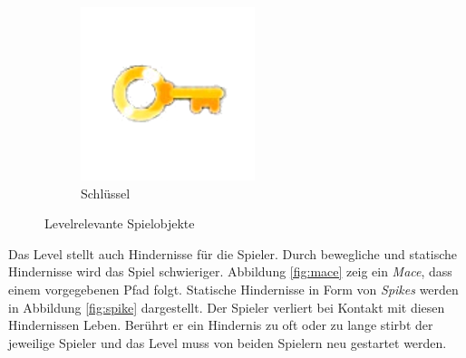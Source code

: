\begin{figure}[H]
\begin{subfigure}[H]{0.15\textwidth}
        \includegraphics[width=\textwidth]{img/realisierung/assets/key}
        \caption{Schlüssel}
        \label{fig:schluessel}
    \end{subfigure}
    \caption{Levelrelevante Spielobjekte}
    \label{fig:keyandchest}
\end{figure}

Das Level stellt auch Hindernisse für die Spieler. Durch bewegliche und statische Hindernisse wird das Spiel schwieriger. Abbildung \ref{fig:mace} zeig ein \textit{Mace}, dass einem vorgegebenen Pfad folgt. Statische Hindernisse in Form von \textit{Spikes} werden in Abbildung \ref{fig:spike} dargestellt. Der Spieler verliert bei Kontakt mit diesen Hindernissen Leben. Berührt er ein Hindernis zu oft oder zu lange stirbt der jeweilige Spieler und das Level muss von beiden Spielern neu gestartet werden.

